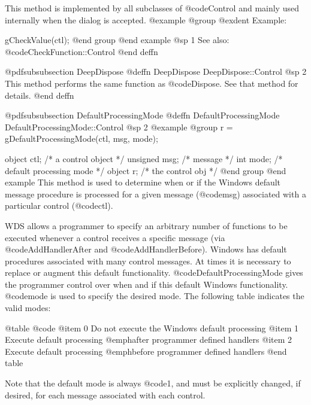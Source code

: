 This method is implemented by all subclasses of @code{Control} and mainly
used internally when the dialog is accepted.
@example
@group
@exdent Example:

gCheckValue(ctl);
@end group
@end example
@sp 1
See also:  @code{CheckFunction::Control}
@end deffn


















@pdfsubsubsection {DeepDispose}
@deffn {DeepDispose} DeepDispose::Control
@sp 2
This method performs the same function as @code{Dispose}.  See that
method for details.
@end deffn









@pdfsubsubsection {DefaultProcessingMode}
@deffn {DefaultProcessingMode} DefaultProcessingMode::Control
@sp 2
@example
@group
r = gDefaultProcessingMode(ctl, msg, mode);

object   ctl;   /*  a control object         */
unsigned msg;   /*  message                  */
int      mode;  /*  default processing mode  */
object   r;     /*  the control obj          */
@end group
@end example
This method is used to determine when or if the Windows default message
procedure is processed for a given message (@code{msg}) associated with
a particular control (@code{ctl}).

WDS allows a programmer to specify an arbitrary number of functions
to be executed whenever a control receives a specific message (via
@code{AddHandlerAfter} and @code{AddHandlerBefore}).  Windows has
default procedures associated with many control messages.  At times
it is necessary to replace or augment this default functionality.
@code{DefaultProcessingMode} gives the programmer control over when and
if this default Windows functionality.  @code{mode} is used to specify
the desired mode.  The following table indicates the valid modes:

@table @code
@item 0
Do not execute the Windows default processing
@item 1
Execute default processing @emph{after} programmer defined handlers
@item 2
Execute default processing @emph{before} programmer defined handlers
@end table

Note that the default mode is always @code{1}, and must be explicitly
changed, if desired, for each message associated with each control.

